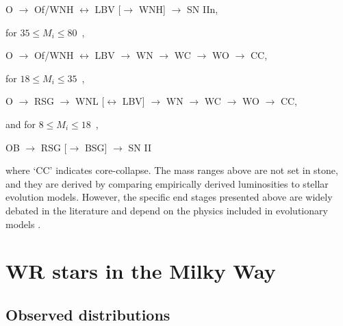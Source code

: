 \centerline{O $\longrightarrow$ Of/WNH $\longleftrightarrow$ LBV  [$\longrightarrow$ WNH] $\longrightarrow$ SN IIn,}

for $35 \le M_i \le 80\,$ \Msun{},

\centerline{O $\longrightarrow$ Of/WNH $\longleftrightarrow$ LBV  $\longrightarrow$ WN $\longrightarrow$ WC $\longrightarrow$ WO $\longrightarrow$ CC,}

for $18 \le M_i \le 35\,$ \Msun{},

\centerline{O $\longrightarrow$ RSG $\longrightarrow$ WNL [$\longleftrightarrow$ LBV] $\longrightarrow$ WN $\longrightarrow$ WC $\longrightarrow$ WO $\longrightarrow$ CC,}

and for $8 \le M_i \le 18\,$ \Msun{},

\centerline{OB $\longrightarrow$ RSG [$\longrightarrow$ BSG] $\longrightarrow$ SN II}

where `CC' indicates core-collapse. The mass ranges above are not set in stone, and they are derived by comparing empirically derived luminosities to stellar evolution models. However, the specific end stages presented above are widely debated in the literature and depend on the physics included in evolutionary models \citep[e.g., see][]{heger_how_2003,woosley_supernova_2006,2017LamersLevesque}.

\section{WR stars in the Milky Way}


\subsection{Observed distributions}


